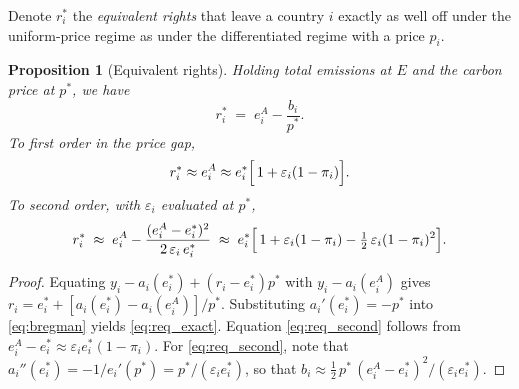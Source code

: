 \documentclass[12pt,english]{article}
\newtheorem{proposition}{Proposition}
\theoremstyle{remark}
\begin{document}
Denote $r^*_i$ the \textit{equivalent rights} that leave a country $i$ exactly as well off under the uniform-price regime as under the differentiated regime with a price $p_i$. 
\begin{proposition}[Equivalent rights]\label{prop:equiv}
Holding total emissions at $E$ and the carbon price at $p^*$, we have
\begin{equation}
  r^*_i \;=\; e^A_i - \frac{b_i}{p^*}. 
  \label{eq:req_exact}
\end{equation}
To first order in the price gap, 
\begin{equation}
  r^*_i \approx e^A_i \approx e^*_i\Bigl[\,1+\varepsilon_i(1-\pi_i)\Bigr].
    \label{eq:req_first}
\end{equation}
To second order, with $\varepsilon_i$ evaluated at $p^*$,
\begin{equation}
  r^*_i \;\approx\; e^A_i - \frac{(e^A_i-e^*_i)^2}{2\,\varepsilon_i\,e^*_i}
  \;\approx\; e^*_i\Bigl[\,1+\varepsilon_i(1-\pi_i)-\tfrac12\,\varepsilon_i(1-\pi_i)^2\Bigr].
  \label{eq:req_second}
\end{equation}
\end{proposition}

\begin{proof}
Equating $y_i-a_i(e^*_i)+(r_i-e^*_i)p^*$ with $y_i-a_i(e^A_i)$ gives $r_i=e^*_i+[a_i(e^*_i)-a_i(e^A_i)]/p^*$. Substituting $a_i'(e^*_i)=-p^*$ into \eqref{eq:bregman} yields \eqref{eq:req_exact}. Equation \eqref{eq:req_second} follows from $e^A_i-e^*_i\approx\varepsilon_i e^*_i(1-\pi_i)$. For \eqref{eq:req_second}, note that $a_i''(e^*_i)=-1/e_i'(p^*)=p^*/(\varepsilon_i e^*_i)$, so that $b_i\approx \tfrac12\,p^*\,(e^A_i-e^*_i)^2/(\varepsilon_i e^*_i)$. 
\end{proof}
\end{document}

